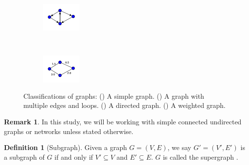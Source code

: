 \documentclass[10pt,a4paper]{article}
\theoremstyle{plain}
\theoremstyle{definition}
\newtheorem{defn}[subsection]{Definition}
\newtheorem{rem}[subsection]{Remark}
\begin{document}
\begin{figure}[!h]
\begin{subfigure}[b]{0.22\textwidth}
		\includegraphics[width=\textwidth]{images/directed-graph.pdf}
		\caption{}
		\label{directedgraph}
	\end{subfigure}
	~
	\begin{subfigure}[b]{0.23\textwidth}
		\includegraphics[width=\textwidth]{images/weighted-graph.pdf}
		\caption{}
		\label{weightedgraph}
	\end{subfigure}
	\caption{Classifications of graphs: () A simple graph. () A graph with multiple edges and loops. () A directed graph. () A weighted graph.}
	\label{fig:graphtypes}
\end{figure} 

\begin{rem} 
	In this  study, we will be working with simple connected undirected graphs or networks unless stated otherwise.\\
	\end{rem}
\begin{defn}[Subgraph]
	Given a graph $G=(V,E)$, we say $G'=(V',E')$ is a subgraph of $G$ if and only if $V' \subseteq V$ and $E' \subseteq E$. $G$ is called the supergraph \citep{estrada2015first}. \\ 
\end{defn}
\end{document}
